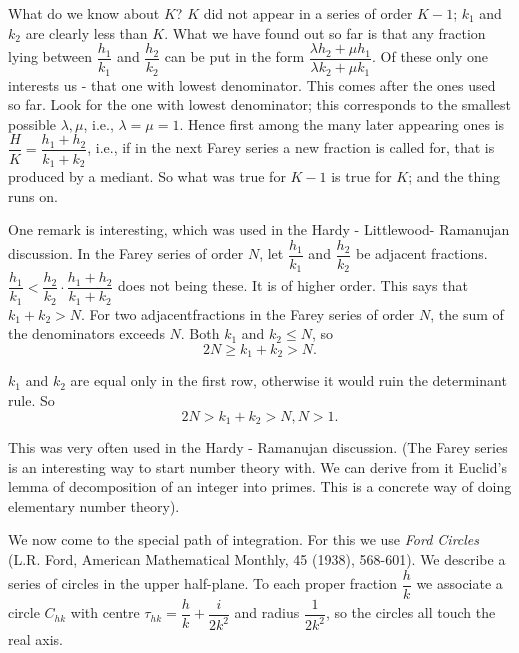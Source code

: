 What do we know about $K$? $K$ did not appear in a series of order
$K-1$; $k_1$ and $k_2$ are clearly less than $K$. What we have found
out so far is that any fraction lying between $\dfrac{h_1}{k_1}$ and
$\dfrac{h_2}{k_2}$ can be put in the form $\dfrac{\lambda h_2 + \mu
  h_1}{\lambda k_2 + \mu k_1}$. Of these only one interests us - that
one with lowest denominator. This comes after the ones used so
far. Look for the one with lowest denominator; this corresponds to the
smallest possible $\lambda, \mu$, i.e., $\lambda= \mu =1$. Hence first
among the many later appearing ones is $\dfrac{H}{K}= \dfrac{h_1 +
  h_2}{k_1+ k_2}$, i.e., if in the next Farey series a new fraction is
called for, that is produced by a mediant. So what was true for $K-1$
is true for $K$; and the thing runs on.

One remark is interesting, which was used in the Hardy - Littlewood-
Ramanujan discussion. In the Farey series of order $N$, let
$\dfrac{h_1}{k_1}$ and $\dfrac{h_2}{k_2}$ be adjacent
fractions. $\dfrac{h_1}{k_1} < \dfrac{h_2}{k_2} \cdot
\dfrac{h_1+h_2}{k_1+ k_2}$ does not being these. It is of higher
order. This says that $k_1 + k_2 > N$. For two
adjacent\pageoriginale fractions in the Farey series of order $N$,
the sum of the denominators exceeds $N$. Both $k_1$ and $k_2 \leq N$,
so 
$$
2N \geq k_1+k_2 > N.
$$  

$k_1$ and $k_2$ are equal only in the first row, otherwise it would
ruin the determinant rule. So
$$
2N > k_1 + k_2 > N, N>1.
$$

This was very often used in the Hardy - Ramanujan discussion. (The
Farey series is an interesting way to start number theory with. We can
derive from it Euclid's lemma of decomposition of an integer into
primes. This is a concrete way of doing elementary number theory). 

We now come to the special path of integration. For this we use
\textit{Ford Circles} (L.R. Ford, American Mathematical Monthly, 45
(1938), 568-601). We describe a series of circles in the upper
half-plane. To each proper fraction $\dfrac{h}{k}$ we associate a
circle $C_{hk}$ with centre $\tau_{hk} = \dfrac{h}{k} +
\dfrac{i}{2k^2}$ and radius $\dfrac{1}{2k^2}$, so the circles all
touch the real axis. 
\begin{figure}[H]
\end{figure}

